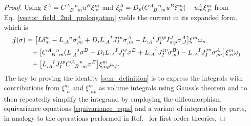 \begin{proof}
  Using $\xi^A = \gmc{A}{B}{n}{m}u^B\xi^m_{,n}$ and $\xi^A_p = D_p(\gmc{A}{B}{n}{m}u^B\xi^m_{,n})-u^A_m\xi^m_{,p}$ from Eq.~\ref{vector_field_2nd_prolongation} yields the current in its expanded form, which is
  \begin{equation}\label{sem_calculation_current}
    \begin{aligned}
      \boldsymbol{j}(\sigma) &{} = \big\lbrack L\delta^n_m - L_{:A}^{\hphantom{:A}n}\sigma^A_{,m} + D_iL_{:A}^{\hphantom{:A}I}J_I^{in}\sigma^A_{,m}-L_{:A}^{\hphantom{:A}I}J_I^{np}I^J_{mp}\sigma^A_{,J}\big\rbrack \xi^m \omega_n \\
                             &{} \hphantom{=} + \big\lbrack \gmc{A}{B}{n}{m}(L_{:A}^{\hphantom{:A}j}\sigma^B - D_iL_{:A}^{\hphantom{:A}I}J_{I}^{ij}\sigma^B + L_{:A}^{\hphantom{:A}^I}J_{I}^{jp}\sigma^B_{,p}) - L_{:A}^{\hphantom{:A}I} J_I^{jn} \sigma^A_{,m}\big\rbrack \xi^m_{,n}\omega_j \\
                             &{} \hphantom{=} + \big\lbrack L_{:A}^{\hphantom{:A}I} J_I^{jp} \gmc{A}{B}{n}{m}\sigma^B\big\rbrack \xi^m_{,np}\omega_j.
    \end{aligned}
  \end{equation}
  The key to proving the identity \eqref{sem_definition} is to express the integrals with contributions from $\xi^m_{,n}$ and $\xi^m_{,np}$ as volume integrals using Gauss's theorem and to then repeatedly simplify the integrand by employing the diffeomorphism equivariance equations \eqref{equivariance_eqns} and a variant of integration by parts, in analogy to the operations performed in Ref.~\cite{goma} for first-order theories.


\end{proof}
